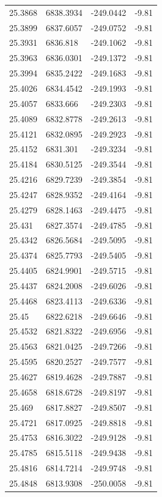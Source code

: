\begin{table}[H]
\begin{tabular}{llll}
25.3868 & 6838.3934 & -249.0442 & -9.81 \\
25.3899 & 6837.6057 & -249.0752 & -9.81 \\
25.3931 & 6836.818 & -249.1062 & -9.81 \\
25.3963 & 6836.0301 & -249.1372 & -9.81 \\
25.3994 & 6835.2422 & -249.1683 & -9.81 \\
25.4026 & 6834.4542 & -249.1993 & -9.81 \\
25.4057 & 6833.666 & -249.2303 & -9.81 \\
25.4089 & 6832.8778 & -249.2613 & -9.81 \\
25.4121 & 6832.0895 & -249.2923 & -9.81 \\
25.4152 & 6831.301 & -249.3234 & -9.81 \\
25.4184 & 6830.5125 & -249.3544 & -9.81 \\
25.4216 & 6829.7239 & -249.3854 & -9.81 \\
25.4247 & 6828.9352 & -249.4164 & -9.81 \\
25.4279 & 6828.1463 & -249.4475 & -9.81 \\
25.431 & 6827.3574 & -249.4785 & -9.81 \\
25.4342 & 6826.5684 & -249.5095 & -9.81 \\
25.4374 & 6825.7793 & -249.5405 & -9.81 \\
25.4405 & 6824.9901 & -249.5715 & -9.81 \\
25.4437 & 6824.2008 & -249.6026 & -9.81 \\
25.4468 & 6823.4113 & -249.6336 & -9.81 \\
25.45 & 6822.6218 & -249.6646 & -9.81 \\
25.4532 & 6821.8322 & -249.6956 & -9.81 \\
25.4563 & 6821.0425 & -249.7266 & -9.81 \\
25.4595 & 6820.2527 & -249.7577 & -9.81 \\
25.4627 & 6819.4628 & -249.7887 & -9.81 \\
25.4658 & 6818.6728 & -249.8197 & -9.81 \\
25.469 & 6817.8827 & -249.8507 & -9.81 \\
25.4721 & 6817.0925 & -249.8818 & -9.81 \\
25.4753 & 6816.3022 & -249.9128 & -9.81 \\
25.4785 & 6815.5118 & -249.9438 & -9.81 \\
25.4816 & 6814.7214 & -249.9748 & -9.81 \\
25.4848 & 6813.9308 & -250.0058 & -9.81 \\

\end{tabular}
\end{table}
